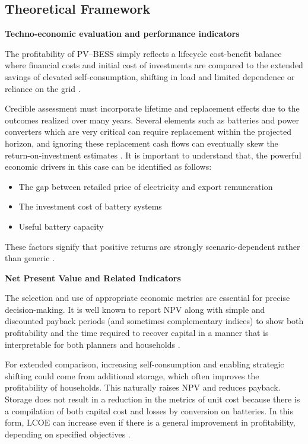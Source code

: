 \subsection{Theoretical Framework}
\label{subsec:theoretical-framework}

\noindent\textbf{Techno-economic evaluation and performance indicators}\par

The profitability of PV--BESS simply reflects a lifecycle cost-benefit
balance where financial costs and initial cost of investments are compared
to the extended savings of elevated self-consumption, shifting in load and
limited dependence or reliance on the grid \cite{ch2ref001}.

Credible assessment must incorporate lifetime and replacement effects due
to the outcomes realized over many years. Several elements such as batteries
and power converters which are very critical can require replacement within
the projected horizon, and ignoring these replacement cash flows can
eventually skew the return-on-investment estimates \cite{ch2ref002}. It is
important to understand that, the powerful economic drivers in this case can
be identified as follows:

\begin{itemize}
    \item The gap between retailed price of electricity and export remuneration
    \item The investment cost of battery systems
    \item Useful battery capacity
\end{itemize}

These factors signify that positive returns are strongly scenario-dependent
rather than generic \cite{ch2ref003}.

\textbf{Net Present Value and Related Indicators}

The selection and use of appropriate economic metrics are essential for precise decision-making. It is well known to report NPV along with simple and discounted payback
periods (and sometimes complementary indices) to show both profitability and
the time required to recover capital in a manner that is interpretable for
both planners and households \cite{ch2ref006}.

For extended comparison, increasing self-consumption and enabling strategic
shifting could come from additional storage, which often improves the
profitability of households. This naturally raises NPV and reduces payback.
Storage does not result in a reduction in the metrics of unit cost because
there is a compilation of both capital cost and losses by conversion on
batteries. In this form, LCOE can increase even if there is a general
improvement in profitability, depending on specified objectives
\cite{ch2ref012}.

